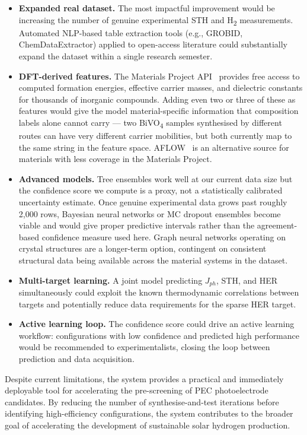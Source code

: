 \begin{itemize}
  \item \textbf{Expanded real dataset.}
        The most impactful improvement would be increasing the number of genuine
        experimental STH and H\textsubscript{2} measurements.
        Automated NLP-based table extraction tools (e.g., GROBID, ChemDataExtractor)
        applied to open-access literature could substantially expand the dataset
        within a single research semester.

  \item \textbf{DFT-derived features.}
        The Materials Project API~\cite{jain2013commentary} provides free access
        to computed formation energies, effective carrier masses, and dielectric
        constants for thousands of inorganic compounds.
        Adding even two or three of these as features would give the model
        material-specific information that composition labels alone cannot carry ---
        two BiVO\textsubscript{4} samples synthesised by different routes can have
        very different carrier mobilities, but both currently map to the same string
        in the feature space.
        AFLOW~\cite{curtarolo2012aflow} is an alternative source for materials with
        less coverage in the Materials Project.

  \item \textbf{Advanced models.}
        Tree ensembles work well at our current data size but the confidence score
        we compute is a proxy, not a statistically calibrated uncertainty estimate.
        Once genuine experimental data grows past roughly 2,000 rows, Bayesian
        neural networks or MC dropout ensembles become viable and would give proper
        predictive intervals rather than the agreement-based confidence measure
        used here.
        Graph neural networks operating on crystal structures are a longer-term
        option, contingent on consistent structural data being available across
        the material systems in the dataset.

  \item \textbf{Multi-target learning.}
        A joint model predicting $J_{ph}$, STH, and HER simultaneously could
        exploit the known thermodynamic correlations between targets and
        potentially reduce data requirements for the sparse HER target.

  \item \textbf{Active learning loop.}
        The confidence score could drive an active learning workflow:
        configurations with low confidence and predicted high performance
        would be recommended to experimentalists, closing the loop
        between prediction and data acquisition.
\end{itemize}

Despite current limitations, the system provides a practical and immediately
deployable tool for accelerating the pre-screening of PEC photoelectrode
candidates.
By reducing the number of synthesise-and-test iterations before identifying
high-efficiency configurations, the system contributes to the broader goal of
accelerating the development of sustainable solar hydrogen production.
